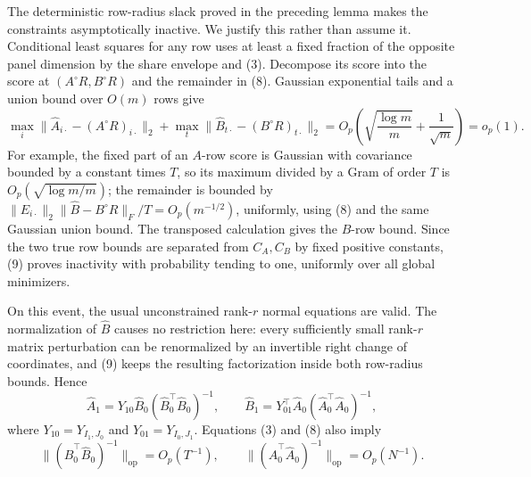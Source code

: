 The deterministic row-radius slack proved in the preceding lemma makes the constraints asymptotically inactive.  We justify this rather than assume it.  Conditional least squares for any row uses at least a fixed fraction of the opposite panel dimension by the share envelope and (3).  Decompose its score into the score at \((A^\circ R,B^\circ R)\) and the remainder in (8).  Gaussian exponential tails and a union bound over \(O(m)\) rows give
\[
 \max_i\|\widehat A_{i\cdot}-(A^\circ R)_{i\cdot}\|_2
 +\max_t\|\widehat B_{t\cdot}-(B^\circ R)_{t\cdot}\|_2
 =O_p\!\left(\sqrt{\frac{\log m}{m}}+\frac1{\sqrt m}\right)=o_p(1).
\tag{9}
\]
For example, the fixed part of an \(A\)-row score is Gaussian with covariance bounded by a constant times \(T\), so its maximum divided by a Gram of order \(T\) is \(O_p(\sqrt{\log m/m})\); the remainder is bounded by \(\|E_{i\cdot}\|_2\|\widehat B-B^\circ R\|_F/T=O_p(m^{-1/2})\), uniformly, using (8) and the same Gaussian union bound.  The transposed calculation gives the \(B\)-row bound.  Since the two true row bounds are separated from \(C_A,C_B\) by fixed positive constants, (9) proves inactivity with probability tending to one, uniformly over all global minimizers.

On this event, the usual unconstrained rank-\(r\) normal equations are valid.  The normalization of \(\widehat B\) causes no restriction here: every sufficiently small rank-\(r\) matrix perturbation can be renormalized by an invertible right change of coordinates, and (9) keeps the resulting factorization inside both row-radius bounds.  Hence
\[
 \widehat A_1
 =Y_{10}\widehat B_0(\widehat B_0^{\top}\widehat B_0)^{-1},
 \qquad
 \widehat B_1
 =Y_{01}^{\top}\widehat A_0(\widehat A_0^{\top}\widehat A_0)^{-1},
\tag{10}
\]
where \(Y_{10}=Y_{I_1,J_0}\) and \(Y_{01}=Y_{I_0,J_1}\).  Equations (3) and (8) also imply
\[
 \| (\widehat B_0^{\top}\widehat B_0)^{-1}\|_{\mathrm{op}}=O_p(T^{-1}),
 \qquad
 \| (\widehat A_0^{\top}\widehat A_0)^{-1}\|_{\mathrm{op}}=O_p(N^{-1}).
\tag{11}
\]

